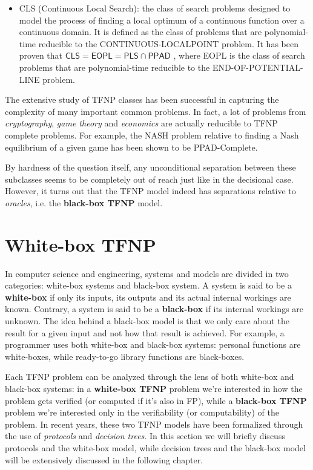 \begin{itemize}
    \item \textsf{CLS} (Continuous Local Search): the class of search problems designed to model the process of finding a local optimum of a continuous function over a continuous domain. It is defined as the class of problems that are polynomial-time reducible to the CONTINUOUS-LOCALPOINT problem. It has been proven that $\mathsf{CLS} = \mathsf{EOPL} = \mathsf{PLS} \cap \mathsf{PPAD}$ \cite{gradient_descent, Further_collapses_TFNP}, where \textsf{EOPL} is the class of search problems that are polynomial-time reducible to the END-OF-POTENTIAL-LINE problem.
\end{itemize}

The extensive study of \textsf{TFNP} classes has been successful in capturing the complexity of many important common problems. In fact, a lot of problems from \textit{cryptography}, \textit{game theory} and \textit{economics} are actually reducible to \textsf{TFNP} complete problems. For example, the $\mathrm{NASH}$ problem relative to finding a Nash equilibrium of a given game has been shown to be \textsf{PPAD}-Complete.

By hardness of the question itself, any unconditional separation between these subclasses seems to be completely out of reach just like in the decisional case. However, it turns out that the \textsf{TFNP} model indeed has separations relative to \textit{oracles}, i.e. the \textbf{black-box \textsf{TFNP}} model.
 
\section{White-box \textsf{TFNP}}

In computer science and engineering, systems and models are divided in two categories: white-box systems and black-box system. A system is said to be a \textbf{white-box} if only its inputs, its outputs and its actual internal workings are known. Contrary, a system is said to be a \textbf{black-box} if its internal workings are unknown. The idea behind a black-box model is that we only care about the result for a given input and not how that result is achieved. For example, a programmer uses both white-box and black-box systems: personal functions are white-boxes, while ready-to-go library functions are black-boxes. 

Each \textsf{TFNP} problem can be analyzed through the lens of both white-box and black-box systems: in a \textbf{white-box \textsf{TFNP}} problem we're interested in how the problem gets verified (or computed if it's also in \textsf{FP}), while a \textbf{black-box \textsf{TFNP}} problem we're interested only in the verifiability (or computability) of the problem. In recent years, these two \textsf{TFNP} models have been formalized through the use of \textit{protocols} and \textit{decision trees}. In this section we will briefly discuss protocols and the white-box model, while decision trees and the black-box model will be extensively discussed in the following chapter. 

